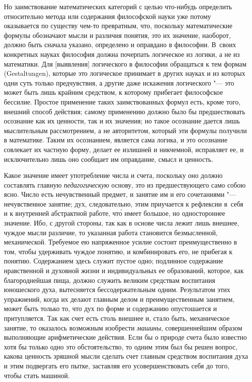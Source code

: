 Но заимствование математических категорий с целью что-нибудь определить
относительно метода или содержания философской науки уже потому оказывается по
существу чем-то превратным, что, поскольку математические формулы обозначают
мысли и различия понятия, это их значение, наоборот, должно быть сначала
указано, определено и оправдано в философии. В~своих конкретных науках
философия должна почерпать логическое из логики, а не из математики. Для
[выявления] логического в философии обращаться к тем формам (Gestal\-tungen),
которые это логическое принимает в других науках и из которых одни суть только
предчувствия, а другие даже искажения логического "--- это может быть лишь
крайним средством, к которому прибегает философское бессилие. Простое применение
таких заимствованных формул есть, кроме того, внешний способ действия; самому
применению должно было бы предшествовать осознание как их ценности, так и их
значения; но такое осознание дается лишь мыслительным рассмотрением, а не
авторитетом, который эти формулы получили в математике. Таким их осознанием,
является сама логика, и это осознание совлекает их частную форму, делает ее
излишней и никчемной, исправляет ее, и исключительно лишь оно сообщает им
оправдание, смысл и ценность.

Какое значение имеет употребление числа и счета, поскольку оно должно
составлять главную {\em педагогическую} основу, это из предшествующего само
собою ясно. Число есть нечувственный предмет, и занятие им и его сочетаниями
"--- нечувственное занятие; дух, следовательно, этим приучается к рефлексии
в~себя и к внутренней абстрактной работе, чт\'{о} имеет большое, но одностороннее
значение. Ибо, с другой стороны, так как в основе числа лежит лишь внешнее,
чуждое мысли различие, то указанная работа становится безмысленной,
механической. Требуемое ею напряженное усилие состоит преимущественно в том,
чтобы удерживать чуждое понятию, и комбинировать его, не прибегая к понятию.
Содержанием здесь служит пустое одно; подлинное содержание
нравственной и духовной жизни и индивидуальных ее образований, которое, как
благороднейшая пища, должно служить великим средствам воспитания юношеского
духа, вытесняется бессодержательным одним. Результатом этих упражнений,
когда их делают главным делом и преимущественным занятием, может быть только
то, что дух по форме и содержанию опустошается и притупляется. Так как счет
есть столь внешнее и, стало быть, механическое занятие, то оказалось возможным
изобрести {\em машины}, совершеннейшим образом выполняющие арифметические
действия. Если бы о природе счета было известно хотя бы только одно это
обстоятельство, то одним этим был бы решен вопрос, какова ценность зряшной
мысли сделать счет главным средством воспитания духа и этим подвергать его
пытке, заставляя его усовершенствовать себя до того, чтобы стать машиной.

